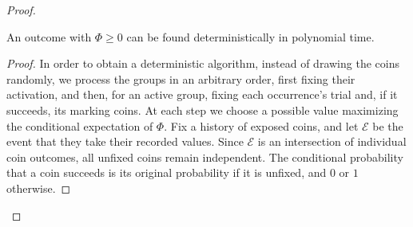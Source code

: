 \begin{proof}
\begin{claim}\label{claim:rbsc-conditional-expectations}
An outcome with $\Phi\geq0$ can be found deterministically in polynomial time.
\end{claim}
\begin{proof}
In order to obtain a deterministic algorithm, instead of drawing the coins randomly, we process the groups in an arbitrary order, first fixing their activation, and then, for an active group, fixing each occurrence's trial and, if it succeeds, its marking coins. At each step we choose a possible value maximizing the conditional expectation of $\Phi$.
Fix a history of exposed coins, and let $\mathcal{E}$ be the event that they take their recorded values. Since $\mathcal{E}$ is an intersection of individual coin outcomes, all unfixed coins remain independent. The conditional probability that a coin succeeds is its original probability if it is unfixed, and $0$ or $1$ otherwise.


\end{proof}
\end{proof}
